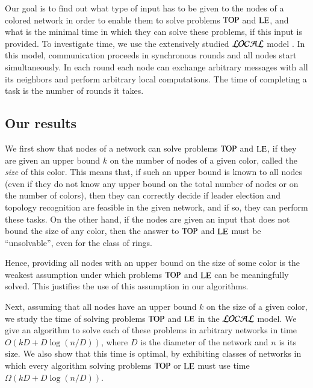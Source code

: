 \documentclass[a4paper,10pt]{article}
\newcommand{\problemLE}{\textup{LE}}
\newcommand{\problemTOP}{\textup{TOP}}
\begin{document}
Our goal is to find out what type of input has to be given to the nodes of a colored network in order to enable them to solve problems $\problemTOP$ and $\problemLE$, and what is the minimal time in which they can solve these problems, if this input is provided.
To investigate time, we use the extensively studied $\cal{LOCAL}$ model \cite{Pe}.
In this model, communication proceeds in synchronous rounds and all nodes start simultaneously.
In each round each node can exchange arbitrary messages with all its neighbors and perform arbitrary local computations. 
The time of completing a task is the number of rounds it takes.






\subsection{Our results} \label{subsec:our_results}


We first show that nodes of a network can solve problems $\problemTOP$ and $\problemLE$, if they are given
an upper bound $k$ on the number of nodes of a given color, called the {\em size} of this color.
This means that, if such an upper bound is known to all nodes (even if they do not know any upper bound on the total number of nodes
or on the number of colors), then they can correctly decide if leader election and topology recognition
are feasible in the given network, and if so, they can perform these tasks. 
On the other hand, if the nodes are given an input that does not bound the size of any color, then the answer to $\problemTOP$ and $\problemLE$ must be ``unsolvable'', even for the class of rings.

Hence, providing all nodes with an upper bound on the size of some color is the weakest assumption under which problems $\problemTOP$ and $\problemLE$ can be meaningfully solved. 
This justifies the use of this assumption in our algorithms.


Next, assuming that all nodes have an upper bound $k$ on the size of a given color,
we study the time of solving problems $\problemTOP$ and $\problemLE$ in the $\cal{LOCAL}$ model. We give an 
algorithm to solve each of these problems in arbitrary networks in time $O(kD+D\log(n/D))$, where $D$ is the diameter
of the network and $n$ is its size. We also show that this time is optimal, by exhibiting
classes of networks in which every algorithm solving problems $\problemTOP$ or $\problemLE$ must use time
$\Omega(kD+D\log(n/D))$.
\end{document}
